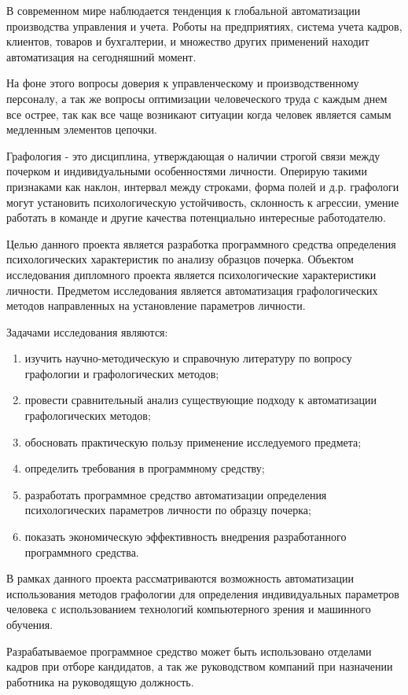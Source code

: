 \label{sec:intro}

В современном мире наблюдается тенденция к глобальной автоматизации производства управления и учета. Роботы на предприятиях, система учета кадров, клиентов, товаров и бухгалтерии, и множество других применений находит автоматизация на сегодняшний момент.

На фоне этого вопросы доверия к управленческому и производственному персоналу, а так же вопросы оптимизации человеческого труда с каждым днем все острее, так как все чаще возникают ситуации когда человек
является самым медленным элементов цепочки.

Графология - это дисциплина, утверждающая о наличии строгой связи между почерком и индивидуальными особенностями личности. Оперирую такими признаками как наклон, интервал между строками, форма полей и д.р. графологи могут установить психологическую устойчивость, склонность к агрессии, умение работать в команде и другие качества потенциально интересные работодателю.

Целью данного проекта является разработка программного средства определения психологических характеристик по анализу образцов почерка.  
Объектом исследования дипломного проекта является психологические характеристики личности.
Предметом исследования является автоматизация графологических методов направленных на установление параметров личности.

Задачами исследования являются:
\begin{enumerate}
  \item изучить научно-методическую и справочную литературу по вопросу графологии и графологических методов;
  \item провести сравнительный анализ существующие подходу к автоматизации графологических методов;
  \item обосновать практическую пользу применение исследуемого предмета;
  \item определить требования в программному средству;
  \item разработать программное средство автоматизации определения психологических параметров личности по образцу почерка;
  \item показать экономическую эффективность внедрения разработанного программного средства.
\end{enumerate}

В рамках данного проекта рассматриваются возможность автоматизации использования методов графологии для определения индивидуальных параметров человека с использованием технологий компьютерного зрения и машинного обучения.

Разрабатываемое программное средство может быть использовано отделами кадров при отборе кандидатов, а так же руководством компаний при назначении работника на руководящую должность.